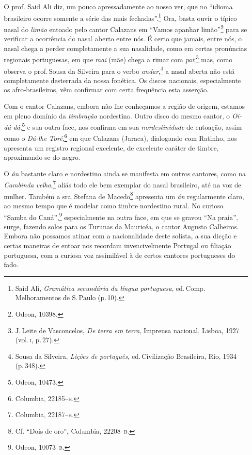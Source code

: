 O prof. Said Ali diz, um pouco apressadamente ao nosso ver, que no
``idioma brasileiro ocorre somente a série das mais fechadas''.\footnote{Said Ali, \textit{Gramática secundária da língua portuguesa}, ed.\,Comp.
Melhoramentos de S.\,Paulo (p.\,10).}
Ora, basta ouvir o típico nasal do \textit{limão} entoado pelo cantor
Calazans em ``Vamos apanhar limão''\footnote{Odeon, 10398.} para se verificar a
ocorrência do nasal aberto entre nós. É certo que jamais, entre nós, o
nasal chega a perder completamente a sua nasalidade, como em certas
pronúncias regionais portuguesas, em que \textit{mai} (mãe) chega a rimar com
\textit{pai};\footnote{J.\,Leite de Vasconcelos, \textit{De terra em terra}, Imprensa nacional,
Lisboa, 1927 (vol.\,\textsc{i}, p.\,27).} mas, como observa o prof.\,Sousa da Silveira para o verbo
\textit{andar},\footnote{Sousa da Silveira, \textit{Lições de português}, ed.\,Civilização Brasileira,
Rio, 1934 (p.\,348).} a nasal aberta não está completamente desterrada da nossa
fonética. Os discos nacionais, especialmente os afro-brasileiros, vêm
confirmar com certa frequência esta asserção.

Com o cantor Calazans, embora não lhe conheçamos a região de origem,
estamos em pleno domínio da \textit{timbração} nordestina. Outro disco do mesmo
cantor, o \textit{Oi-dá-dá},\footnote{Odeon, 10473.} e sua outra face, nos confirma em sua
\textit{nordestinidade} de entoação, assim como o \textit{Dá-lhe Toré},\footnote{Columbia,
22185--\textsc{b}.} em que Calazans (Jaraca), dialogando com Ratinho, nos
apresenta um registro regional excelente, de excelente caráter de
timbre, aproximando-se do negro.

O \textit{án} bastante claro e nordestino ainda se manifesta em outros cantores,
como na \textit{Cambinda velha},\footnote{Columbia, 22187--\textsc{b}.} aliás todo ele bem exemplar
do nasal brasileiro, até na voz de mulher. Também a sra.\,Stefana de
Macedo\footnote{Cf. ``Dois de oro'', Columbia, 22208--\textsc{b}.} apresenta um \textit{án}
regularmente claro, ao mesmo tempo que é modelar como timbre nordestino
rural. No curioso ``Samba do Caná'',\footnote{Odeon, 10073--\textsc{b}.} especialmente na outra
face, em que se gravou ``Na praia'', surge, fazendo solos para os
Turunas da Mauricéa, o cantor Augusto Calheiros. Embora não possamos
atinar com a nacionalidade deste solista, a sua dicção e certas maneiras
de entoar nos recordam invencivelmente Portugal ou filiação portuguesa,
com a curiosa voz assimilável à de certos cantores portugueses do fado.

